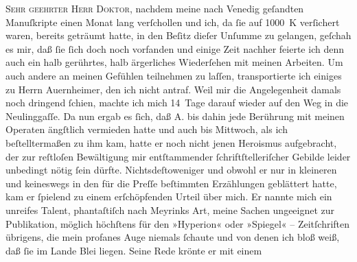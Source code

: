\pstart{}\textsc{Sehr geehrter Herr Doktor,}\pend\vspace{0.5em}
\pstart
           nachdem meine nach Venedig geſandten Manuſkripte
               einen Monat lang verſchollen und ich, da ſie auf 1000 K verſichert waren, bereits
               geträumt hatte, in den Beſitz dieſer Unſumme zu gelangen, geſchah es mir, daß ſie
               ſich doch noch vorfanden und einige Zeit nachher feierte ich denn auch ein halb
               gerührtes, halb ärgerliches Wiederſehen mit meinen Arbeiten. Um auch andere an meinen
               Gefühlen teilnehmen zu laſſen, transportierte ich einiges zu Herrn Auernheimer, den ich nicht antraf. Weil mir die
               Angelegenheit {\pb}damals noch dringend
               ſchien, machte ich mich 14 Tage darauf wieder auf den Weg in die Neulinggaſſe. Da nun ergab es ſich, daß A. bis dahin jede Berührung mit meinen Operaten ängſtlich
               vermieden hatte und auch bis Mittwoch, als ich beſtelltermaßen zu ihm
               kam, hatte er noch nicht jenen Heroismus aufgebracht, der zur reſtloſen Bewältigung
               mir entſtammender ſchriftſtelleriſcher Gebilde leider unbedingt nötig ſein dürfte.
               Nichtsdeſtoweniger und obwohl er nur in kleineren und keineswegs in den für die Preſſe beſtimmten Erzählungen geblättert hatte,
               kam er ſpielend zu einem erſchöpfenden Urteil über mich. Er nannte mich ein unreifes
               Talent, phantaſtiſch nach Meyrinks Art, meine
               Sachen ungeeignet zur Publikation, möglich höchſtens für den »Hyperion« oder »Spiegel« –
               Zeitſchriften {\pb}übrigens, die mein profanes
               Auge niemals ſchaute und von denen ich bloß weiß, daß ſie im Lande Blei liegen. Seine Rede krönte er mit einem
